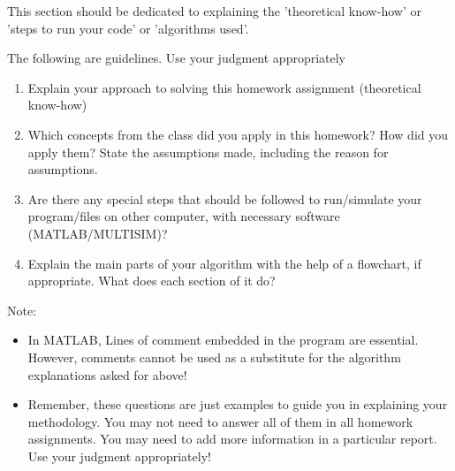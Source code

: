 
    This section should be dedicated to explaining the 'theoretical know-how' or 'steps to run your code' or 'algorithms used'. 

The following are guidelines. Use your judgment appropriately

\begin{enumerate}
\item Explain your approach to solving this homework assignment (theoretical know-how)
\item Which concepts from the class did you apply in this homework?  How did you apply them? State the assumptions made, including the reason for assumptions.
\item Are there any special steps that should be followed to run/simulate your program/files on other computer, with necessary software (MATLAB/MULTISIM)?
\item Explain the main parts of your algorithm with the help of a flowchart, if appropriate. What does each section of it do? 
\end{enumerate}




 Note:
\begin{itemize}
\item  In MATLAB, Lines of comment embedded in the program are essential. However, comments cannot be used as a substitute for the algorithm explanations asked for above!
\item  Remember, these questions are just examples to guide you in explaining your methodology. You may not need to answer all of them in all homework assignments. You may need to add more information in a particular report. Use your judgment appropriately!
\end{itemize}



